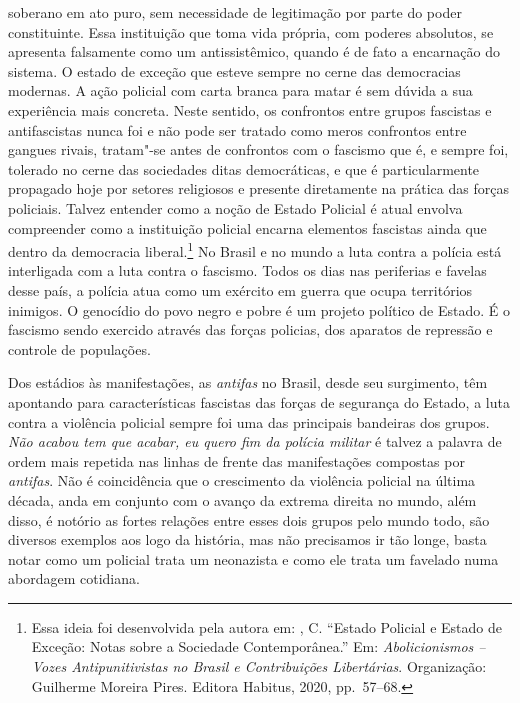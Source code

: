 soberano em ato puro, sem necessidade de legitimação por parte do poder
constituinte. Essa instituição que toma vida própria, com poderes
absolutos, se apresenta falsamente como um antissistêmico, quando é de
fato a encarnação do sistema. O estado de exceção que esteve sempre no
cerne das democracias modernas. A ação policial com carta branca para
matar é sem dúvida a sua experiência mais concreta. Neste sentido, os
confrontos entre grupos fascistas e antifascistas nunca foi e não pode
ser tratado como meros confrontos entre gangues rivais, tratam"-se antes
de confrontos com o fascismo que é, e sempre foi, tolerado no cerne das
sociedades ditas democráticas, e que é particularmente propagado hoje
por setores religiosos e presente diretamente na prática das forças
policiais. Talvez entender como a noção de Estado Policial é atual
envolva compreender como a instituição policial encarna elementos
fascistas ainda que dentro da democracia liberal.\footnote{Essa ideia
  foi desenvolvida pela autora em: , C. ``Estado Policial e
  Estado de Exceção: Notas sobre a Sociedade Contemporânea.'' Em:
  \emph{Abolicionismos -- Vozes Antipunitivistas no Brasil e
  Contribuições Libertárias}. Organização: Guilherme Moreira Pires.
  Editora Habitus, 2020, pp.~57--68.} No Brasil e no mundo a luta contra
a polícia está interligada com a luta contra o fascismo. Todos os dias
nas periferias e favelas desse país, a polícia atua como um exército em
guerra que ocupa territórios inimigos. O genocídio do povo negro e pobre
é um projeto político de Estado. É o fascismo sendo exercido através das
forças policias, dos aparatos de repressão e controle de populações.

Dos estádios às manifestações, as \emph{antifas} no Brasil, desde seu
surgimento, têm apontando para características fascistas das forças de
segurança do Estado, a luta contra a violência policial sempre foi uma
das principais bandeiras dos grupos. \emph{Não acabou tem que acabar, eu
quero fim da polícia militar} é talvez a palavra de ordem mais repetida
nas linhas de frente das manifestações compostas por \emph{antifas}. Não
é coincidência que o crescimento da violência policial na última década,
anda em conjunto com o avanço da extrema direita no mundo, além disso, é
notório as fortes relações entre esses dois grupos pelo mundo todo, são
diversos exemplos aos logo da história, mas não precisamos ir tão longe,
basta notar como um policial trata um neonazista e como ele trata um
favelado numa abordagem cotidiana.

